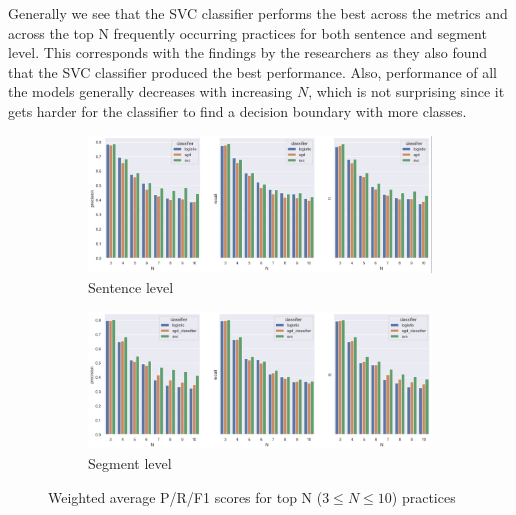 Generally we see that the SVC classifier performs the best across the metrics and across the top N frequently occurring practices for both sentence and segment level. This corresponds with the findings by the researchers as they also found that the SVC classifier produced the best performance. Also, performance of all the models generally decreases with increasing $N$, which is not surprising since it gets harder for the classifier to find a decision boundary with more classes.

\begin{figure}[!ht]
    \begin{subfigure}[b]{1\textwidth}
      \centering
	  \includegraphics[width=1\linewidth]{figures/model_n_testing_sentence.png}      
	  \caption{Sentence level}
	  \label{fig:top_n_practices_sentence}
    \end{subfigure}
    \hfill
    \begin{subfigure}[b]{1\textwidth}
      \centering
      \includegraphics[width=1\linewidth]{figures/model_n_testing_segment.png}
      \caption{Segment level}
	  \label{fig:top_n_practices_segment}
    \end{subfigure}
    \caption{Weighted average P/R/F1 scores for top N ($3 \le N \le 10$) practices}
    \label{fig:top_n_practices}
\end{figure}



